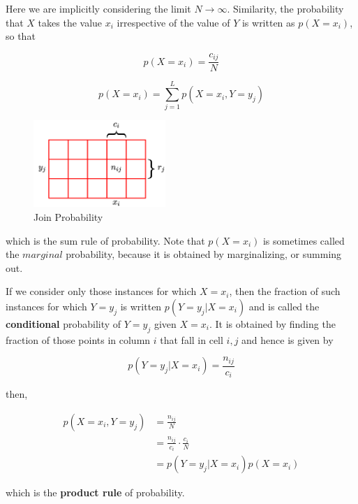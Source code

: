 Here we are implicitly considering the limit $N \rightarrow \infty$. Similarity, the probability that $X$ takes the value $x_i$ irrespective of the value of $Y$ is written as $p(X = x_i)$, so that

\begin{equation}
    p(X = x_i) = \frac{c_{ij}}{N}
\end{equation}

\begin{equation}
    p(X = x_i) = \sum_{j=1}^L p(X = x_i, Y = y_j)
\end{equation}

\begin{figure}
    \centering
    \includegraphics[width=5cm]{chapter008/figures/fig002.png}
    \caption{Join Probability}
\end{figure}

which is the sum rule of probability.  Note that $p(X=x_i)$ is sometimes called the $marginal$ probability, because it is obtained by marginalizing, or summing out.

If we consider only those instances for which $X = x_i$, then the fraction of such instances for which $Y=y_j$ is written $p(Y = y_j | X = x_i)$ and is called the \textbf{conditional} probability of $Y=y_j$ given $X=x_i$. It is obtained by finding the fraction of those points in column $i$ that fall in cell $i,j$ and hence is given by

\begin{equation}
    p(Y = y_j | X = x_i) = \frac{n_{ij}}{c_i}
\end{equation}

then,

\begin{equation}
    \begin{split}
        p(X = x_i, Y = y_j) & = \frac{n_{ij}}{N}\\
        & = \frac{n_{ij}}{c_i} \cdot \frac{c_i}{N}\\
        & = p(Y = y_j | X = x_i)p(X = x_i)
    \end{split}
\end{equation}

which is the \textbf{product rule} of probability.

